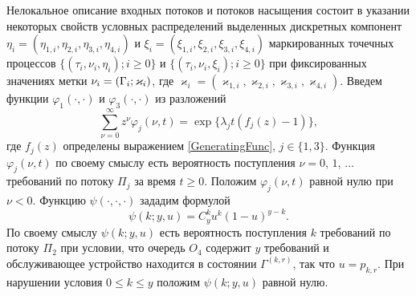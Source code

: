 \documentclass[a4paper,12pt,russian]{extarticle}
\begin{document}
Нелокальное описание входных потоков и потоков насыщения состоит в указании некоторых свойств условных распределений выделенных дискретных компонент $\eta_i=(\eta_{1,i},\eta_{2,i}, \eta_{3,i}, \eta_{4,i})$ и $\xi_i=(\xi_{1,i}, \xi_{2,i}, \xi_{3,i}, \xi_{4,i})$ маркированных точечных процессов \linebreak $\{(\tau_i, \nu_i, \eta_i); i\geqslant 0\}$ и $\{(\tau_i, \nu_i, \xi_i); i\geqslant 0\}$ при фиксированных значениях метки $\nu_i \hm= (\Gamma_i;\varkappa_i)$, где $\varkappa_i=(\varkappa_{1,i},\varkappa_{2,i},\varkappa_{3,i},\varkappa_{4,i})$. 
Введем функции $\varphi_1(\cdot,\cdot)$ и $\varphi_3(\cdot,\cdot)$ из разложений 
\begin{equation*}
\sum_{\nu=0}^{\infty} z^\nu\varphi_j(\nu,t) = \exp\{\lambda_j t (f_j(z)-1)\},
\end{equation*}
где $f_j(z)$ определены выражением \eqref{GeneratingFunc}, $j \in \{1,3\}$. Функция $\varphi_j(\nu,t)$ по своему смыслу есть вероятность поступления $\nu=0$, $1$, $\ldots$ требований по потоку $\Pi_j$ за время $t \geqslant 0$. Положим $\varphi_j(\nu,t)$ равной нулю при $\nu < 0$. Функцию $\psi(\cdot,\cdot,\cdot)$ зададим формулой
\begin{equation*}
\psi(k;y,u)=C_y^k u^k (1-u)^{y-k}.	
\end{equation*}
По своему смыслу $\psi(k;y,u)$ есть вероятность поступления $k$ требований по потоку $\Pi_2$ при условии, что очередь $O_4$ содержит $y$ требований и обслуживающее устройство находится в состоянии $\Gamma^{(k,r)}$, так что $u=p_{k,r}$. При нарушении условия $ 0\leqslant k \leqslant y$ положим $\psi(k;y,u)$ равной нулю.
\end{document}
